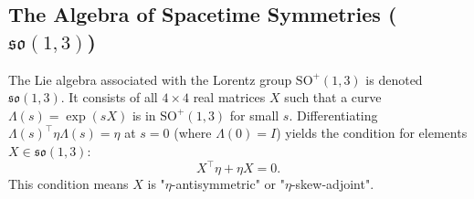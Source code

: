 \documentclass{amsart}
\theoremstyle{definition}
\theoremstyle{remark}
\begin{document}
\subsection{The Algebra of Spacetime Symmetries ($\mathfrak{so}(1,3)$)}
\label{subsec:so13_algebra}
The Lie algebra associated with the Lorentz group $\mathrm{SO}^+(1,3)$ is denoted $\mathfrak{so}(1,3)$. It consists of all \(4 \times 4\) real matrices \(X\) such that a curve $\Lambda(s) = \exp(sX)$ is in $\mathrm{SO}^+(1,3)$ for small $s$. Differentiating $\Lambda(s)^\top \eta \Lambda(s) = \eta$ at $s=0$ (where $\Lambda(0)=I$) yields the condition for elements $X \in \mathfrak{so}(1,3)$:
\begin{equation*}
X^\top \eta + \eta X = 0.
\end{equation*}
This condition means $X$ is "$\eta$-antisymmetric" or "$\eta$-skew-adjoint".
\end{document}
